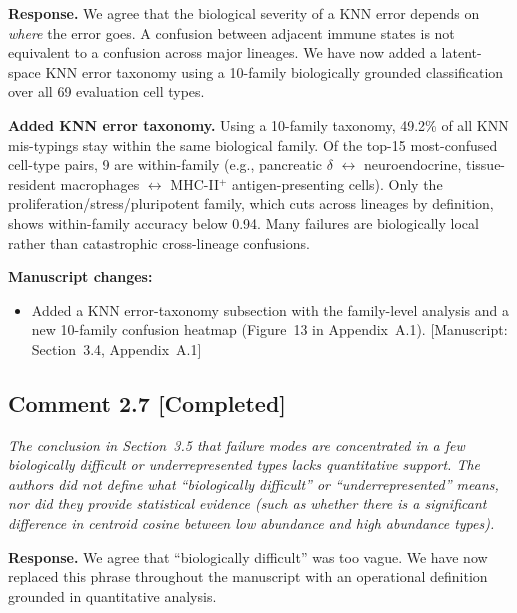 \documentclass[11pt,letterpaper]{article}
\newcommand{\statuscompleted}{\textcolor{statusgreen}{\textbf{[Completed]}}}
\newcommand{\msref}[1]{\textcolor{blue!60!black}{\textsf{[Manuscript: #1]}}}
\begin{document}
\noindent\textbf{Response.}
We agree that the biological severity of a KNN error depends on \emph{where} the error goes. A confusion between adjacent immune states is not equivalent to a confusion across major lineages. We have now added a latent-space KNN error taxonomy using a 10-family biologically grounded classification over all 69 evaluation cell types.

\begin{revisionupdate}
\textbf{Added KNN error taxonomy.}
Using a 10-family taxonomy, 49.2\% of all KNN mis-typings stay within the same biological family. Of the top-15 most-confused cell-type pairs, 9 are within-family (e.g., pancreatic $\delta$ $\leftrightarrow$ neuroendocrine, tissue-resident macrophages $\leftrightarrow$ MHC-II$^+$ antigen-presenting cells). Only the proliferation/stress/pluripotent family, which cuts across lineages by definition, shows within-family accuracy below 0.94. Many failures are biologically local rather than catastrophic cross-lineage confusions.
\end{revisionupdate}

\noindent\textbf{Manuscript changes:}
\begin{itemize}
  \item Added a KNN error-taxonomy subsection with the family-level analysis and a new 10-family confusion heatmap (Figure~13 in Appendix~A.1). \msref{Section~3.4, Appendix~A.1}
\end{itemize}

\medskip

\subsection*{Comment 2.7 \hfill \statuscompleted}

\begin{reviewercomment}
\itshape
The conclusion in Section~3.5 that failure modes are concentrated in a few biologically difficult or underrepresented types lacks quantitative support. The authors did not define what ``biologically difficult'' or ``underrepresented'' means, nor did they provide statistical evidence (such as whether there is a significant difference in centroid cosine between low abundance and high abundance types).
\end{reviewercomment}

\noindent\textbf{Response.}
We agree that ``biologically difficult'' was too vague. We have now replaced this phrase throughout the manuscript with an operational definition grounded in quantitative analysis.
\end{document}
